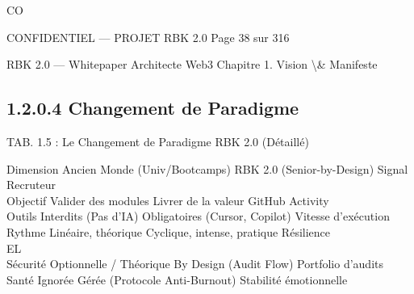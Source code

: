 CO\\
\vspace{0.5em}
\vspace{0.5em}
\vspace{0.5em}
\vspace{0.5em}
\begin{confidential}CONFIDENTIEL — PROJET RBK 2.0                               Page 38 sur 316\end{confidential}
RBK 2.0 — Whitepaper Architecte Web3                                                                               Chapitre 1. Vision \textbackslash{}& Manifeste\\
\vspace{0.5em}
\vspace{0.5em}
\subsection{1.2.0.4 Changement de Paradigme}
\vspace{0.5em}
\vspace{0.5em}
\begin{center}\begin{tabular}TAB. 1.5 : Le Changement de Paradigme RBK 2.0 (Détaillé)\end{tabular}\end{center}
\vspace{0.5em}
\vspace{0.5em}
Dimension     Ancien Monde (Univ/Bootcamps)      RBK 2.0 (Senior-by-Design)         Signal Recruteur\\
\vspace{0.5em}
Objectif      Valider des modules                Livrer de la valeur                GitHub Activity\\
Outils        Interdits (Pas d’IA)               Obligatoires (Cursor, Copilot)     Vitesse d’exécution\\
Rythme        Linéaire, théorique                Cyclique, intense, pratique        Résilience\\
\vspace{0.5em}
\vspace{0.5em}
\vspace{0.5em}
\vspace{0.5em}
EL\\
Sécurité      Optionnelle / Théorique            By Design (Audit Flow)             Portfolio d’audits\\
Santé         Ignorée                            Gérée (Protocole Anti-Burnout)     Stabilité émotionnelle\\
